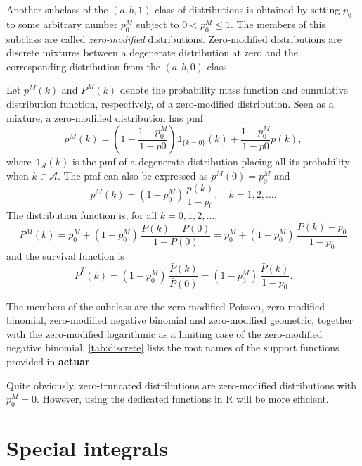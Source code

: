 \documentclass[x11names]{article}
\newcommand{\proglang}[1]{\textsf{#1}}
\newcommand{\pkg}[1]{\textbf{#1}}
\begin{document}
Another subclass of the $(a, b, 1)$ class of distributions is obtained
by setting $p_0$ to some arbitrary number $p_0^M$ subject to
$0 < p_0^M \leq 1$. The members of this subclass are called
\emph{zero-modified} distributions. Zero-modified distributions are
discrete mixtures between a degenerate distribution at zero and the
corresponding distribution from the $(a, b, 0)$ class.

Let $p^M(k)$ and $P^M(k)$ denote the probability mass function and
cumulative distribution function, respectively, of a zero-modified
distribution. Seen as a mixture, a zero-modified distribution has pmf
\begin{equation}
  \label{eq:mixture}
  p^M(k) = \left(1 - \frac{1 - p_0^M}{1 - p0} \right) \mathbb{1}_{\{k = 0\}}(k)
  + \frac{1 - p_0^M}{1 - p0} p(k),
\end{equation}
where $\mathbb{1}_{\mathcal{A}}(k)$ is the pmf of a degenerate
distribution placing all its probability when $k \in \mathcal{A}$. The
pmf can also be expressed as $p^M(0) = p_0^M$ and
\begin{equation*}
  p^M(k) = (1 - p_0^M)\, \frac{p(k)}{1 - p_0}, \quad k = 1, 2, \dots.
\end{equation*}
The distribution function is, for all $k = 0, 1, 2, \dots$,
\begin{equation*}
  P^M(k)
  = p_0^M + (1 - p_0^M)\, \frac{P(k) - P(0)}{1 - P(0)}
  = p_0^M + (1 - p_0^M)\, \frac{P(k) - p_0}{1 - p_0}
\end{equation*}
and the survival function is
\begin{equation*}
  \bar{P}^T(k)
  = (1 - p_0^M)\, \frac{\bar{P}(k)}{\bar{P}(0)}
  = (1 - p_0^M)\, \frac{\bar{P}(k)}{1 - p_0}.
\end{equation*}

The members of the subclass are the zero-modified Poisson,
zero-modified binomial, zero-modified negative binomial and
zero-modified geometric, together with the zero-modified logarithmic
as a limiting case of the zero-modified negative binomial.
\autoref{tab:discrete} lists the root names of the support functions
provided in \pkg{actuar}.

Quite obviously, zero-truncated distributions are zero-modified
distributions with $p_0^M = 0$. However, using the dedicated functions
in \proglang{R} will be more efficient.


\section{Special integrals}
\label{sec:special-integrals}
\end{document}
